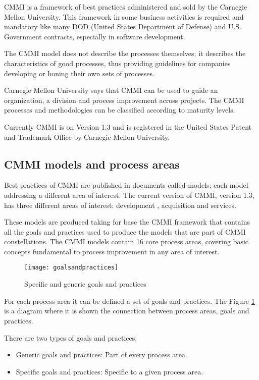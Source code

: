 CMMI is a framework of best practices administered and sold by the Carnegie Mellon University. This framework in some business activities is required and mandatory like many DOD (United States Department of Defense) and U.S. Government contracts, especially in software development.

The CMMI model does not describe the processes themselves; it describes the characteristics of good processes, thus providing guidelines for companies developing or honing their own sets of processes.

Carnegie Mellon University says that CMMI can be used to guide an organization, a division and process improvement across projects. The CMMI processes and methodologies can be classified according to maturity levels.

Currently CMMI is on Version 1.3 and is registered in the United States Patent and Trademark Office by Carnegie Mellon University.

\subsection{CMMI models and process areas}
Best practices of CMMI are published in documents called models; each model addressing a different area of interest. The current version of CMMI, version 1.3, has three different areas of interest: development \citep{Chrissis2006}, acquisition and services.

These models are produced taking for base the CMMI framework that contains all the goals and practices used to produce the models that are part of CMMI constellations. The CMMI models contain 16 core process areas, covering basic concepts fundamental to process improvement in any area of interest. 

\begin{figure}[h]
	\begin{center}
		\leavevmode
		\texttt{[image: goalsandpractices]}
		\caption{Specific and generic goals and practices}
		\label{fig:goalsandpractices}
	\end{center}
\end{figure}


For each process area it can be defined a set of goals and practices. The Figure \ref{fig:goalsandpractices} is a diagram where it is shown the connection between process areas, goals and practices. 

There are two types of goals and practices:
\begin{itemize}
	\item Generic goals and practices: Part of every process area.
	\item Specific goals and practices: Specific to a given process area.
\end{itemize}

